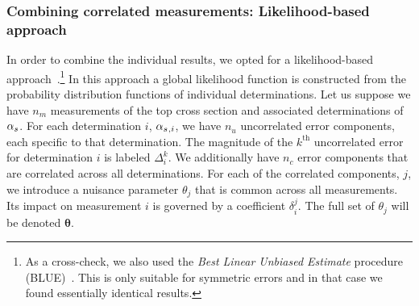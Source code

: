 \subsubsection{Combining correlated measurements: Likelihood-based approach}

In order to combine the individual results, we opted for a
likelihood-based approach~\cite{Cowan:2010js}.\footnote{As a cross-check, we also
  used the \textit{Best Linear Unbiased Estimate} procedure
  (BLUE)~\cite{BLUE1,Valassi:2003mu}. This is only suitable for symmetric
  errors and in that case we found essentially identical results.}
%
In this
approach a global likelihood function is constructed from the
probability distribution functions of individual determinations.  
%
Let us suppose we have $n_m$ measurements of the top cross section and
associated determinations of $\alpha_s$. 
%
For each determination $i$, $\alpha_s{}_{,i}$, we have $n_u$ uncorrelated
error components, each specific to that determination.
%
The magnitude of the $k^\text{th}$ uncorrelated error for
determination $i$ is labeled $\Delta^k_i$.
%
We additionally have $n_c$ error components that are correlated across
all determinations.
%
For each of the correlated components, $j$, we introduce a nuisance
parameter $\theta_j$ that is common across all measurements.
%
Its impact on measurement $i$ is governed by a coefficient
$\delta_i^j$. 
%
The full set of $\theta_j$ will be denoted $\bm\theta$.

